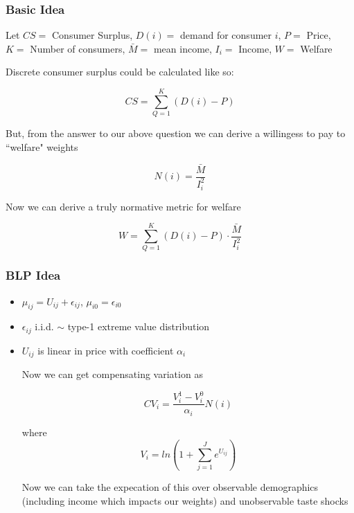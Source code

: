 \documentclass{beamer}
\begin{document}
\begin{frame}
\frametitle{Basic Idea}

Let $CS =$ Consumer Surplus, $D(i)=$ demand for consumer $i$, $P =$ Price, $K =$ Number of consumers, 
$\bar{M} =$ mean income, $I_i =$ Income, $W = $ Welfare   

\vspace{.2cm}
Discrete consumer surplus could be calculated like so: 

$$  CS = \sum_{Q = 1}^{K} (D(i) - P) $$

But, from the answer to our above question we can derive a willingess to pay to ``welfare" weights 

$$ N(i) = \frac{\bar{M}}{I_i^2} $$

Now we can derive a truly normative metric for welfare

$$  W = \sum_{Q = 1}^{K} (D(i) - P) \cdot \frac{\bar{M}}{I_i^2}  $$



\end{frame}



\begin{frame}
\frametitle{BLP Idea}

\begin{itemize}
	\item $\mu_{ij} = U_{ij} + \epsilon_{ij}$, $\mu_{i0} = \epsilon_{i0}$
	\item $\epsilon_{ij}$ i.i.d. $\sim$ type-1 extreme value distribution 
	\item $U_{ij}$ is linear in price with coefficient $\alpha_i$
	\vspace{.2cm}
	
	Now we can get compensating variation as 
	
	$$ CV_i = \frac{V_i^1 - V_i^0}{\alpha_i} N(i) $$ 
	
	where 
	$$ V_i = ln(1 + \sum_{j = 1}^{J} e^{U_{ij}})$$ 
	
	Now we can take the expecation of this over observable demographics (including income which impacts our weights) and unobservable taste shocks 
	
\end{itemize}

\end{frame}
\end{document}
